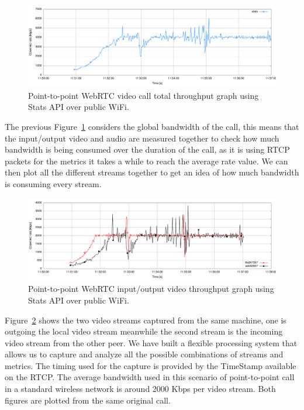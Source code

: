  \begin{figure}[h]
  \centering
    \includegraphics[width=1\textwidth]{./figures/onetooneWifiStatsRTC.pdf}
      \caption[Point-to-point WebRTC video call total throughput graph using Stats API over public WiFi]{Point-to-point WebRTC video call total throughput graph using Stats API over public WiFi.}
	\label{fig:onetooneWifiRTC}
\end{figure}

The previous Figure~\ref{fig:onetooneWifiRTC} considers the global bandwidth of the call, this means that the input/output video and audio are measured together to check how much bandwidth is being consumed over the duration of the call, as it is using RTCP packets for the metrics it takes a while to reach the average rate value. We can then plot all the different streams together to get an idea of how much bandwidth is consuming every stream.

 \begin{figure}[h]
  \centering
    \includegraphics[width=1\textwidth]{./figures/onetooneWiFIStatsVideoStreams.pdf}
      \caption[Point-to-point WebRTC input/output video throughput graph using Stats API over public WiFi]{Point-to-point WebRTC input/output video throughput graph using Stats API over public WiFi.}
	\label{fig:onetooneWifiRTCVideoStreams}
\end{figure}

Figure~\ref{fig:onetooneWifiRTCVideoStreams} shows the two video streams captured from the same machine, one is outgoing the local video stream meanwhile the second stream is the incoming video stream from the other peer. We have built a flexible processing system that allows us to capture and analyze all the possible combinations of streams and metrics. The timing used for the capture is provided by the TimeStamp available on the RTCP. The average bandwidth used in this scenario of point-to-point call in a standard wireless network is around 2000 Kbps per video stream. Both figures are plotted from the same original call.

